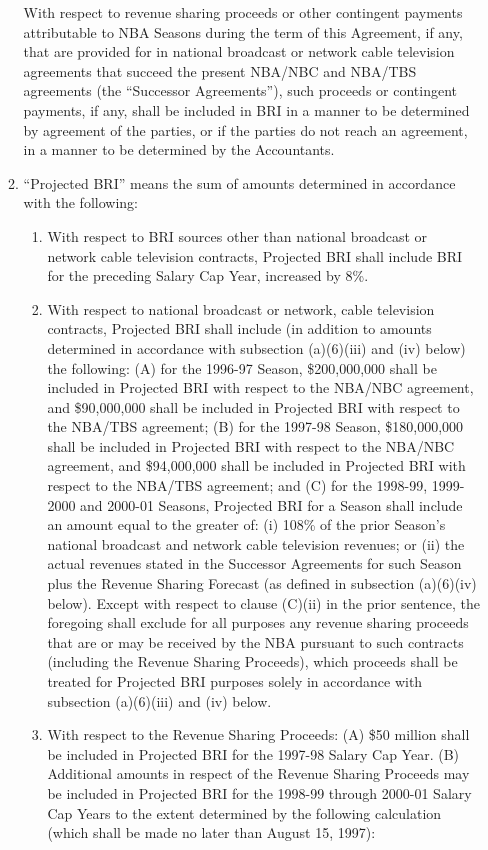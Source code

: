 \documentclass[
]{book}
\providecommand{\tightlist}{%
  \setlength{\itemsep}{0pt}\setlength{\parskip}{0pt}}
\begin{document}
\begin{enumerate}
\begin{enumerate}
    With respect to revenue sharing proceeds or other contingent payments attributable to NBA Seasons during the term of this Agreement, if any, that are provided for in national broadcast or network cable television agreements that succeed the present NBA/NBC and NBA/TBS agreements (the ``Successor Agreements''), such proceeds or contingent payments, if any, shall be included in BRI in a manner to be determined by agreement of the parties, or if the parties do not reach an agreement, in a manner to be determined by the Accountants.
  \item
    ``Projected BRI'' means the sum of amounts determined in accordance with the following:

    \begin{enumerate}
    \def\labelenumiii{(\roman{enumiii})}
    \tightlist
    \item
      With respect to BRI sources other than national broadcast or network cable television contracts, Projected BRI shall include BRI for the preceding Salary Cap Year, increased by 8\%.
    \item
      With respect to national broadcast or network, cable television contracts, Projected BRI shall include (in addition to amounts determined in accordance with subsection (a)(6)(iii) and (iv) below) the following: (A) for the 1996-97 Season, \$200,000,000 shall be included in Projected BRI with respect to the NBA/NBC agreement, and \$90,000,000 shall be included in Projected BRI with respect to the NBA/TBS agreement; (B) for the 1997-98 Season, \$180,000,000 shall be included in Projected BRI with respect to the NBA/NBC agreement, and \$94,000,000 shall be included in Projected BRI with respect to the NBA/TBS agreement; and (C) for the 1998-99, 1999-2000 and 2000-01 Seasons, Projected BRI for a Season shall include an amount equal to the greater of: (i) 108\% of the prior Season's national broadcast and network cable television revenues; or (ii) the actual revenues stated in the Successor Agreements for such Season plus the Revenue Sharing Forecast (as defined in subsection (a)(6)(iv) below). Except with respect to clause (C)(ii) in the prior sentence, the foregoing shall exclude for all purposes any revenue sharing proceeds that are or may be received by the NBA pursuant to such contracts (including the Revenue Sharing Proceeds), which proceeds shall be treated for Projected BRI purposes solely in accordance with subsection (a)(6)(iii) and (iv) below.
    \item
      With respect to the Revenue Sharing Proceeds:
      (A) \$50 million shall be included in Projected BRI for the 1997-98 Salary Cap Year.
      (B) Additional amounts in respect of the Revenue Sharing Proceeds may be included in Projected BRI for the 1998-99 through 2000-01 Salary Cap Years to the extent determined by the following calculation (which shall be made no later than August 15, 1997):


\end{enumerate}
\end{enumerate}
\end{enumerate}
\end{document}
